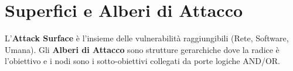 \documentclass{article}
\begin{document}
\section{Superfici e Alberi di Attacco}
L'\textbf{Attack Surface} è l'insieme delle vulnerabilità raggiungibili (Rete, Software, Umana). Gli \textbf{Alberi di Attacco} sono strutture gerarchiche dove la radice è l'obiettivo e i nodi sono i sotto-obiettivi collegati da porte logiche AND/OR.
\end{document}
